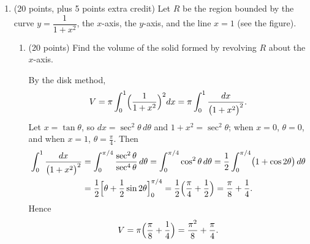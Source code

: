 \documentclass[12pt,letterpaper]{article}
\newcommand{\points}[1]{(#1 points)}
\begin{document}
\begin{enumerate}[label=\textbf{\arabic*.},leftmargin=2em]
  \item (20 points, plus 5 points extra credit)
    Let $R$ be the region bounded by the curve $y=\dfrac{1}{1+x^2}$, the
    $x$-axis, the $y$-axis, and the line $x=1$ (see the figure).

    \begin{center}
    \end{center}

    \begin{enumerate}[label=(\alph*)]
      \item \points{20} Find the volume of the solid formed by revolving $R$
        about the $x$-axis.

        \begin{solution}
          By the disk method,
          \[
            V=\pi\int_0^1\Bigl(\frac{1}{1+x^2}\Bigr)^2dx
             =\pi\int_0^1\frac{dx}{\bigl(1+x^2\bigr)^2}.
          \]
          Let $x=\tan\theta$, so $dx=\sec^2\theta\,d\theta$ and
          $1+x^2=\sec^2\theta$; when $x=0$, $\theta=0$, and when $x=1$,
          $\theta=\frac\pi4$. Then
          \begin{align*}
            \int_0^1\frac{dx}{\bigl(1+x^2\bigr)^2}
            &=\int_0^{\pi/4}\frac{\sec^2\theta}{\sec^4\theta}\,d\theta
             =\int_0^{\pi/4}\cos^2\theta\,d\theta
             =\frac12\int_0^{\pi/4}\bigl(1+\cos2\theta\bigr)\,d\theta\\
            &=\frac12\Bigl[\theta+\frac12\sin2\theta\Bigr]_0^{\pi/4}
             =\frac12\Bigl(\frac\pi4+\frac12\Bigr)
             =\frac\pi8+\frac14.
          \end{align*}
          Hence
          \[
            V=\pi\Bigl(\frac\pi8+\frac14\Bigr)=\frac{\pi^2}{8}+\frac{\pi}{4}.
          \]
        \end{solution}


\end{enumerate}
\end{enumerate}
\end{document}
